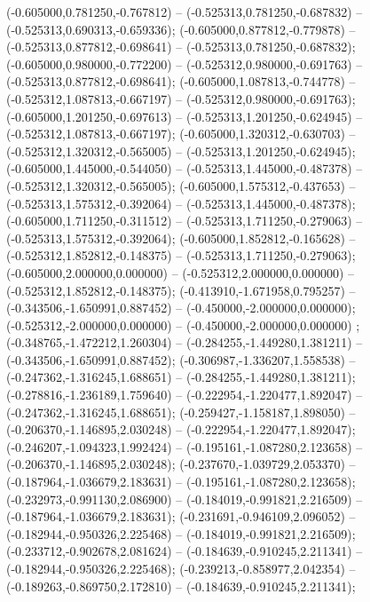  (-0.605000,0.781250,-0.767812) -- (-0.525313,0.781250,-0.687832) -- (-0.525313,0.690313,-0.659336);
 (-0.605000,0.877812,-0.779878) -- (-0.525313,0.877812,-0.698641) -- (-0.525313,0.781250,-0.687832);
 (-0.605000,0.980000,-0.772200) -- (-0.525312,0.980000,-0.691763) -- (-0.525313,0.877812,-0.698641);
 (-0.605000,1.087813,-0.744778) -- (-0.525312,1.087813,-0.667197) -- (-0.525312,0.980000,-0.691763);
 (-0.605000,1.201250,-0.697613) -- (-0.525313,1.201250,-0.624945) -- (-0.525312,1.087813,-0.667197);
 (-0.605000,1.320312,-0.630703) -- (-0.525312,1.320312,-0.565005) -- (-0.525313,1.201250,-0.624945);
 (-0.605000,1.445000,-0.544050) -- (-0.525313,1.445000,-0.487378) -- (-0.525312,1.320312,-0.565005);
 (-0.605000,1.575312,-0.437653) -- (-0.525313,1.575312,-0.392064) -- (-0.525313,1.445000,-0.487378);
 (-0.605000,1.711250,-0.311512) -- (-0.525313,1.711250,-0.279063) -- (-0.525313,1.575312,-0.392064);
 (-0.605000,1.852812,-0.165628) -- (-0.525312,1.852812,-0.148375) -- (-0.525313,1.711250,-0.279063);
 (-0.605000,2.000000,0.000000) -- (-0.525312,2.000000,0.000000) -- (-0.525312,1.852812,-0.148375);
 (-0.413910,-1.671958,0.795257) -- (-0.343506,-1.650991,0.887452) -- (-0.450000,-2.000000,0.000000);
 (-0.525312,-2.000000,0.000000) -- (-0.450000,-2.000000,0.000000) ;
 (-0.348765,-1.472212,1.260304) -- (-0.284255,-1.449280,1.381211) -- (-0.343506,-1.650991,0.887452);
 (-0.306987,-1.336207,1.558538) -- (-0.247362,-1.316245,1.688651) -- (-0.284255,-1.449280,1.381211);
 (-0.278816,-1.236189,1.759640) -- (-0.222954,-1.220477,1.892047) -- (-0.247362,-1.316245,1.688651);
 (-0.259427,-1.158187,1.898050) -- (-0.206370,-1.146895,2.030248) -- (-0.222954,-1.220477,1.892047);
 (-0.246207,-1.094323,1.992424) -- (-0.195161,-1.087280,2.123658) -- (-0.206370,-1.146895,2.030248);
 (-0.237670,-1.039729,2.053370) -- (-0.187964,-1.036679,2.183631) -- (-0.195161,-1.087280,2.123658);
 (-0.232973,-0.991130,2.086900) -- (-0.184019,-0.991821,2.216509) -- (-0.187964,-1.036679,2.183631);
 (-0.231691,-0.946109,2.096052) -- (-0.182944,-0.950326,2.225468) -- (-0.184019,-0.991821,2.216509);
 (-0.233712,-0.902678,2.081624) -- (-0.184639,-0.910245,2.211341) -- (-0.182944,-0.950326,2.225468);
 (-0.239213,-0.858977,2.042354) -- (-0.189263,-0.869750,2.172810) -- (-0.184639,-0.910245,2.211341);
